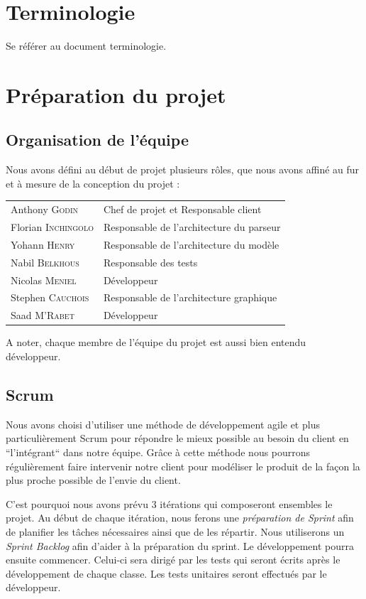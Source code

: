 \documentclass[hidelinks, 10pt,a4paper]{article}
\begin{document}
\newpage
\section{Terminologie}
  Se référer au document terminologie.

\section{Préparation du projet}
\subsection{Organisation de l'équipe}
Nous avons défini au début de projet plusieurs rôles, que nous avons affiné au
fur et à mesure de la conception du projet :
\begin{tabular}{ll}
{Anthony \textsc{Godin}} & {Chef de projet et Responsable client} \\
{Florian \textsc{Inchingolo}} & {Responsable de l'architecture du parseur} \\
{Yohann \textsc{Henry}} & {Responsable de l'architecture du modèle} \\
{Nabil \textsc{Belkhous}} & {Responsable des tests} \\
{Nicolas \textsc{Meniel}} & {Développeur} \\
{Stephen \textsc{Cauchois}} & {Responsable de l'architecture graphique} \\
{Saad \textsc{M'Rabet}} & {Développeur} \\
\end{tabular}

A noter, chaque membre de l'équipe du projet est aussi bien entendu développeur.

\subsection{Scrum}
  Nous avons choisi d'utiliser une méthode de développement agile et plus particulièrement Scrum 
  pour répondre le mieux possible au besoin du client en ``l'intégrant`` dans notre équipe.
  Grâce à cette méthode nous pourrons régulièrement faire intervenir notre client pour modéliser
  le produit de la façon la plus proche possible de l'envie du client.
  
  C'est pourquoi nous avons prévu 3 itérations qui composeront ensembles le projet.
  Au début de chaque itération, nous ferons une \emph{préparation de Sprint} afin de planifier
  les tâches nécessaires ainsi que de les répartir. Nous utiliserons un \emph{Sprint Backlog}
  afin d'aider à la préparation du sprint.
  Le développement pourra ensuite commencer.
  Celui-ci sera dirigé par les tests qui seront écrits après le développement
  de chaque classe. Les tests unitaires seront effectués par le développeur.
  
\end{document}
